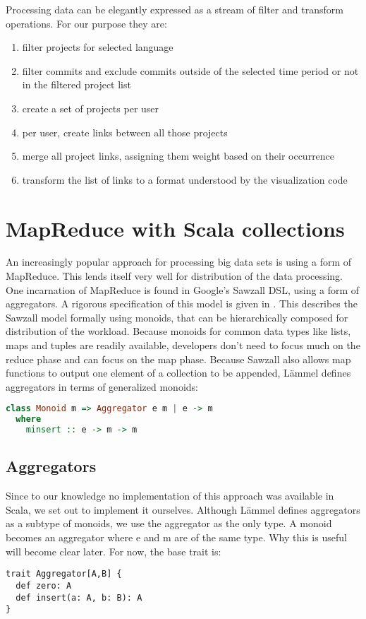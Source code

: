 \documentclass[10pt,a4paper]{article}
\begin{document}
Processing data can be elegantly expressed as a stream of filter and transform operations. For our purpose they are:
\begin{enumerate}
    \item filter projects for selected language
    \item filter commits and exclude commits outside of the selected time period or not in the filtered project list
    \item create a set of projects per user
    \item per user, create links between all those projects
    \item merge all project links, assigning them weight based on their occurrence
    \item transform the list of links to a format understood by the visualization code
\end{enumerate}

\section{MapReduce with Scala collections}\label{sec:mapreduce}

An increasingly popular approach for processing big data sets is using a form of MapReduce. This lends itself very well for distribution of the data processing. One incarnation of MapReduce is found in Google's Sawzall DSL, using a form of aggregators. A rigorous specification of this model is given in \cite{lammel2008google}. This describes the Sawzall model formally using monoids, that can be hierarchically composed for distribution of the workload. Because monoids for common data types like lists, maps and tuples are readily available, developers don't need to focus much on the reduce phase and can focus on the map phase. Because Sawzall also allows map functions to output one element of a collection to be appended, L\"ammel defines aggregators in terms of generalized monoids:
\begin{lstlisting}[language=haskell]
class Monoid m => Aggregator e m | e -> m
  where
    minsert :: e -> m -> m
\end{lstlisting}

\subsection{Aggregators}

Since to our knowledge no implementation of this approach was available in Scala, we set out to implement it ourselves. Although L\"ammel defines aggregators as a subtype of monoids, we use the aggregator as the only type. A monoid becomes an aggregator where e and m are of the same type. Why this is useful will become clear later. For now, the base trait is:
\begin{lstlisting}
trait Aggregator[A,B] {
  def zero: A
  def insert(a: A, b: B): A
}
\end{lstlisting}
\end{document}

